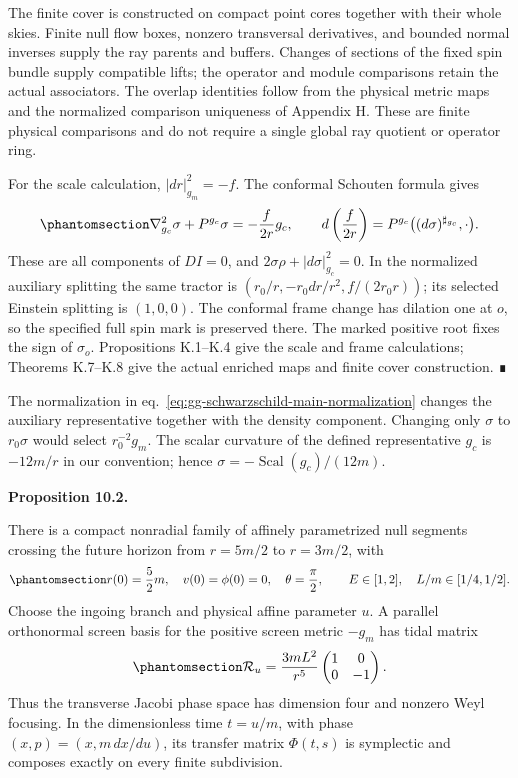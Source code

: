 \documentclass[
  english,
  11pt,
  reqno]{amsart}
\makeatletter
\newcommand{\pandocstatementheading}[1]{%
  \par\addpenalty{\@beginparpenalty}%
  \addvspace{.5\baselineskip plus .2\baselineskip minus .2\baselineskip}%
  {\normalfont\bfseries #1\par}%
  \nobreak\@afterindenttrue\@afterheading
}
\makeatother
\begin{document}
The finite cover is constructed on compact point cores together with
their whole skies. Finite null flow boxes, nonzero transversal
derivatives, and bounded normal inverses supply the ray parents and
buffers. Changes of sections of the fixed spin bundle supply compatible
lifts; the operator and module comparisons retain the actual
associators. The overlap identities follow from the physical metric maps
and the normalized comparison uniqueness of Appendix H. These are finite
physical comparisons and do not require a single global ray quotient or
operator ring.

For the scale calculation, \(|dr|_{g_m}^2=-f\). The conformal Schouten
formula gives
\begin{equation}\protect\phantomsection\label{eq:gg-schwarzschild-main-scale-check}{
 \nabla_{g_c}^2\sigma+P^{g_c}\sigma=-\frac{f}{2r}g_c,
 \qquad
 d\left(\frac f{2r}\right)=P^{g_c}\bigl((d\sigma)^{\sharp_{g_c}},\cdot\bigr).
}\end{equation} These are all components of \(DI=0\), and
\(2\sigma\rho+|d\sigma|_{g_c}^2=0\). In the normalized auxiliary
splitting the same tractor is \((r_0/r,-r_0dr/r^2,f/(2r_0r))\); its
selected Einstein splitting is \((1,0,0)\). The conformal frame change
has dilation one at \(o\), so the specified full spin mark is preserved
there. The marked positive root fixes the sign of \(\sigma_o\).
Propositions K.1--K.4 give the scale and frame calculations; Theorems
K.7--K.8 give the actual enriched maps and finite cover construction. ∎

The normalization in eq.~\ref{eq:gg-schwarzschild-main-normalization}
changes the auxiliary representative together with the density
component. Changing only \(\sigma\) to \(r_0\sigma\) would select
\(r_0^{-2}g_m\). The scalar curvature of the defined representative
\(g_c\) is \(-12m/r\) in our convention; hence
\(\sigma=-\operatorname{Scal}(g_c)/(12m)\).

\pandocstatementheading{\protect{}\label{prop:gg-schwarzschild-main-optics}Proposition 10.2.}

There is a compact nonradial family of affinely parametrized null
segments crossing the future horizon from \(r=5m/2\) to \(r=3m/2\), with
\begin{equation}\protect\phantomsection\label{eq:gg-schwarzschild-main-ray-family}{
 r(0)=\frac52m,\quad v(0)=\phi(0)=0,\quad \theta=\frac\pi2,
 \qquad E\in[1,2],\quad L/m\in[1/4,1/2].
}\end{equation} Choose the ingoing branch and physical affine parameter
\(u\). A parallel orthonormal screen basis for the positive screen
metric \(-g_m\) has tidal matrix
\begin{equation}\protect\phantomsection\label{eq:gg-schwarzschild-main-tide}{
 \mathcal R_u=\frac{3mL^2}{r^5}
 \begin{pmatrix}1&0\\0&-1\end{pmatrix}.
}\end{equation} Thus the transverse Jacobi phase space has dimension
four and nonzero Weyl focusing. In the dimensionless time \(t=u/m\),
with phase \((x,p)=(x,m\,dx/du)\), its transfer matrix \(\Phi(t,s)\) is
symplectic and composes exactly on every finite subdivision.
\end{document}
